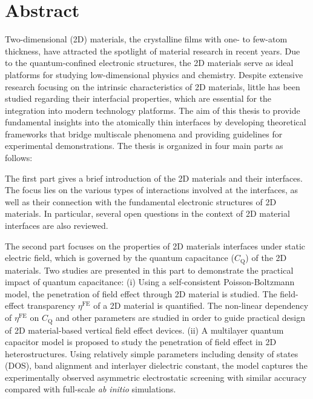 \begingroup
\let\clearpage\relax
\let\cleardoublepage\relax
\let\cleardoublepage\relax

\chapter*{Abstract}

Two-dimensional (2D) materials, the crystalline films with one- to
few-atom thickness, have attracted the spotlight of material research
in recent years.
% 
Due to the quantum-confined electronic structures, the 2D materials
serve as ideal platforms for studying low-dimensional physics and
chemistry.
% 
Despite extensive research focusing on the intrinsic characteristics
of 2D materials, little has been studied regarding their interfacial
properties, which are essential for the integration into modern 
technology platforms.
%
The aim of this thesis to provide fundamental insights into the
atomically thin interfaces by developing theoretical frameworks that
bridge multiscale phenomena and providing guidelines for experimental
demonstrations.  The thesis is organized
in four main parts as follows:

The first part gives a brief introduction of the 2D materials and
their interfaces.
%
The focus lies on the various types of interactions
involved at the interfaces, as well as their connection with the
fundamental electronic structures of 2D materials.
%
In particular, several open questions in the context of
2D material interfaces are also reviewed.

The second part focuses on the properties of 2D materials interfaces
under static electric field, which is governed by the quantum
capacitance ($C_{\mathrm{Q}}$) of the 2D materials.
%
Two studies are presented in this part to demonstrate the practical
impact of quantum capacitance:
%
(i) Using a self-consistent Poisson-Boltzmann model, the penetration of field effect through 2D material is studied. The field-effect transparency
$\eta^{\mathrm{FE}}$ of a 2D material is quantified. The
non-linear dependency of $\eta^{\mathrm{FE}}$ on $C_{\mathrm{Q}}$ and other
parameters are studied in order to guide practical design of 2D
material-based vertical field effect devices.
%
(ii) A multilayer quantum capacitor model is proposed to study the
penetration of field effect in 2D heterostructures. Using relatively
simple parameters including density of states (DOS), band alignment
and interlayer dielectric constant, the model captures the
experimentally observed asymmetric electrostatic screening with
similar accuracy compared with full-scale \textit{ab initio}
simulations.

